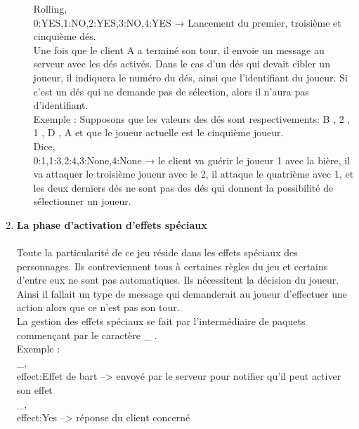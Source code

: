 \documentclass[a4paper,11pt]{article}
\begin{document}
\begin{enumerate}
\begin{enumerate}[label=(\roman*)]
Rolling, \\
0:YES,1:NO,2:YES,3:NO,4:YES → Lancement du premier, troisième et cinquième dés. \\

    Une fois que le client A a terminé son tour, il envoie un message au serveur avec les dés activés. Dans le cas d’un dés qui devait cibler un joueur, il indiquera le numéro du dés, ainsi que l’identifiant du joueur. Si c’est un dés qui ne demande pas de sélection, alors il n’aura pas d’identifiant. \\

    Exemple : Supposons que les valeurs des dés sont respectivements: B , 2 , 1 , D , A et que le joueur actuelle est le cinquième joueur. \\

 Dice,  \\
0:1,1:3,2:4,3:None,4:None → le client va guérir le joueur 1 avec la bière, il va attaquer le 
    troisième joueur avec le 2, il attaque le quatrième avec 1, et 
    les deux derniers dés ne sont pas des dés qui donnent la 
    possibilité de sélectionner un joueur. \\
    
\newpage

		

		\end{enumerate}
	
	\item  \textbf{La phase d’activation d'effets spéciaux} \\\\
	Toute la particularité de ce jeu réside dans les effets spéciaux des personnages. Ils contreviennent tous à certaines règles du jeu et certains d’entre eux ne sont pas automatiques. Ils nécessitent la décision du joueur. Ainsi il fallait un type de message qui demanderait au joueur d'effectuer une action alors que ce n’est pas son tour.  \\
	
    La gestion des effets spéciaux se fait par l'intermédiaire de paquets commençant par le caractère \_ . \\

Exemple : \\
\_, \\
effect:Effet de bart  --> envoyé par le serveur pour notifier qu’il peut activer son effet \\

\_, \\
effect:Yes --> réponse du client concerné \\


\end{enumerate}
\end{document}
